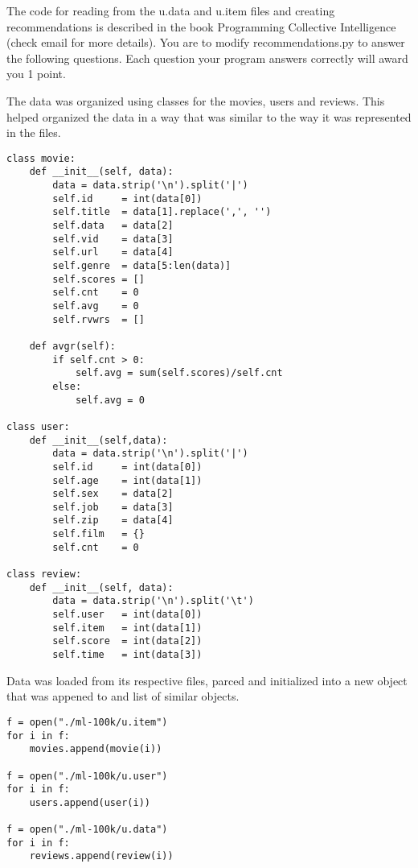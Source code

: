 \documentclass[]{svmono}
\begin{document}
The code for reading from the u.data and u.item files and creating
recommendations is described in the book Programming Collective
Intelligence (check email for more details). You are to modify
recommendations.py to answer the following questions. Each question your
program answers correctly will award you 1 point.



The data was organized using classes for the movies, users and reviews. This helped organized the data in a way that was similar to the way it was represented in the files.

\begin{lstlisting}[caption={Class definitions for movies, users and reviews}]
class movie:
	def __init__(self, data):
		data = data.strip('\n').split('|')		
		self.id 	= int(data[0])
		self.title 	= data[1].replace(',', '')
		self.data 	= data[2]
		self.vid 	= data[3]
		self.url 	= data[4]
		self.genre 	= data[5:len(data)]
		self.scores	= []
		self.cnt	= 0
		self.avg 	= 0
		self.rvwrs	= []

	def avgr(self):
		if self.cnt > 0:
			self.avg = sum(self.scores)/self.cnt
		else:
			self.avg = 0

class user:
	def __init__(self,data):
		data = data.strip('\n').split('|')
		self.id 	= int(data[0])
		self.age	= int(data[1])
		self.sex	= data[2]
		self.job	= data[3]
		self.zip 	= data[4]
		self.film   = {}
		self.cnt	= 0

class review:
	def __init__(self, data):
		data = data.strip('\n').split('\t')
		self.user 	= int(data[0])
		self.item	= int(data[1])
		self.score	= int(data[2])
		self.time	= int(data[3])
\end{lstlisting}

Data was loaded from its respective files, parced and initialized into a new object that was appened to and list of similar objects.

\begin{lstlisting}[caption={Loading data from files to list of objects}]
f = open("./ml-100k/u.item")
for i in f:
	movies.append(movie(i))

f = open("./ml-100k/u.user")
for i in f:
	users.append(user(i))

f = open("./ml-100k/u.data")	
for i in f:
	reviews.append(review(i))
\end{lstlisting}













\end{document}

